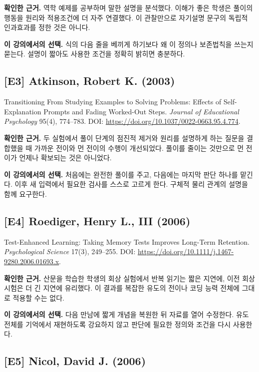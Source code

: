 \documentclass[
  10pt,
  a4paper,
]{article}
\begin{document}
\textbf{확인한 근거.} 역학 예제를 공부하며 말한 설명을 분석했다. 이해가
좋은 학생은 풀이의 행동을 원리와 적용조건에 더 자주 연결했다. 이
관찰만으로 자기설명 문구의 독립적 인과효과를 정한 것은 아니다.

\textbf{이 강의에서의 선택.} 식의 다음 줄을 베끼게 하기보다 왜 이 정의나
보존법칙을 쓰는지 묻는다. 설명이 짧아도 사용한 조건을 정확히 밝히면
충분하다.

\subsection{{[}E3{]} Atkinson, Robert K.
(2003)}\label{e3-atkinson-robert-k.-2003}

Transitioning From Studying Examples to Solving Problems: Effects of
Self-Explanation Prompts and Fading Worked-Out Steps. \emph{Journal of
Educational Psychology} 95(4), 774--783. DOI:
\url{https://doi.org/10.1037/0022-0663.95.4.774}.

\textbf{확인한 근거.} 두 실험에서 풀이 단계의 점진적 제거와 원리를
설명하게 하는 질문을 결합했을 때 가까운 전이와 먼 전이의 수행이
개선되었다. 풀이를 줄이는 것만으로 먼 전이가 언제나 확보되는 것은
아니었다.

\textbf{이 강의에서의 선택.} 처음에는 완전한 풀이를 주고, 다음에는
마지막 판단 하나를 맡긴다. 이후 새 입력에서 필요한 검사를 스스로 고르게
한다. 구체적 물리 관계의 설명을 함께 요구한다.

\subsection{{[}E4{]} Roediger, Henry L., III
(2006)}\label{e4-roediger-henry-l.-iii-2006}

Test-Enhanced Learning: Taking Memory Tests Improves Long-Term
Retention. \emph{Psychological Science} 17(3), 249--255. DOI:
\url{https://doi.org/10.1111/j.1467-9280.2006.01693.x}.

\textbf{확인한 근거.} 산문을 학습한 학생의 회상 실험에서 반복 읽기는
짧은 지연에, 이전 회상 시험은 더 긴 지연에 유리했다. 이 결과를 복잡한
유도의 전이나 코딩 능력 전체에 그대로 적용할 수는 없다.

\textbf{이 강의에서의 선택.} 다음 만남에 짧게 개념을 복원한 뒤 자료를
열어 수정한다. 유도 전체를 기억에서 재현하도록 강요하지 않고 판단에
필요한 정의와 조건을 다시 사용한다.

\subsection{{[}E5{]} Nicol, David J.
(2006)}\label{e5-nicol-david-j.-2006}
\end{document}
